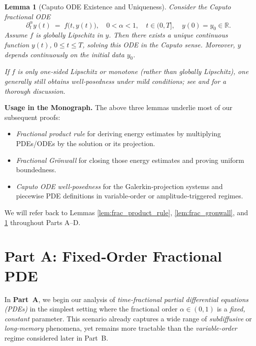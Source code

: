 \documentclass[12pt]{article}
\newtheorem{lemma}[theorem]{Lemma}
\begin{document}
\begin{lemma}[Caputo ODE Existence and Uniqueness]
\label{lem:caputo_ODE_wellposed}
Consider the Caputo fractional ODE
\[
\partial_t^\alpha y(t)
\;=\;
f\bigl(t,y(t)\bigr),
\quad
0<\alpha<1,
\quad
t\in(0,T],
\quad
y(0)=y_0\in\mathbb{R}.
\]
Assume $f$ is globally Lipschitz in $y$.  Then there exists a unique continuous function
$y(t)$, $0\le t\le T$, solving this ODE in the Caputo sense.  Moreover, $y$ depends
continuously on the initial data $y_0$.  

If $f$ is only one‐sided Lipschitz or monotone (rather than globally Lipschitz), one
generally still obtains well‐posedness under mild conditions; see
\cite[Ch.~7]{Diethelm2010} and \cite[Sec.~2.3]{Kilbas2006} for a thorough discussion.
\end{lemma}

\medskip

\noindent
\textbf{Usage in the Monograph.}  
The above three lemmas underlie most of our subsequent proofs:
\begin{itemize}
\item \emph{Fractional product rule} for deriving energy estimates by multiplying
  PDEs/ODEs by the solution or its projection.
\item \emph{Fractional Grönwall} for closing those energy estimates and proving
  uniform boundedness.
\item \emph{Caputo ODE well‐posedness} for the Galerkin‐projection systems and
  piecewise PDE definitions in variable‐order or amplitude‐triggered regimes.
\end{itemize}
We will refer back to Lemmas \ref{lem:frac_product_rule}, \ref{lem:frac_gronwall},
and \ref{lem:caputo_ODE_wellposed} throughout Parts A--D.



\section{Part A: Fixed‐Order Fractional PDE}

In \textbf{Part~A}, we begin our analysis of \emph{time-fractional partial differential equations (PDEs)} in the simplest setting where the fractional order \(\alpha\in (0,1)\) is a \emph{fixed, constant} parameter. This scenario already captures a wide range of \emph{subdiffusive} or \emph{long-memory} phenomena, yet remains more tractable than the \emph{variable-order} regime considered later in Part~B.
\end{document}
